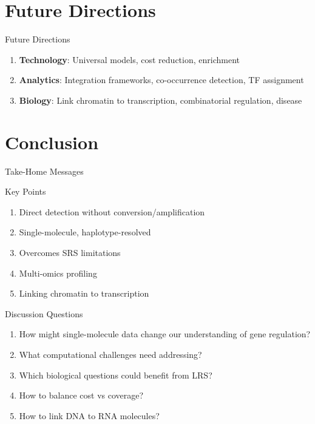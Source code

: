 \documentclass[aspectratio=169]{beamer}
\begin{document}
\section{Future Directions}

\begin{frame}{Future Directions}
  \begin{enumerate}
    \item \textbf{Technology}: Universal models, cost reduction, enrichment

    \item \textbf{Analytics}: Integration frameworks, co-occurrence detection, TF assignment

    \item \textbf{Biology}: Link chromatin to transcription, combinatorial regulation, disease
  \end{enumerate}
\end{frame}

\section{Conclusion}

\begin{frame}{Take-Home Messages}
  \begin{alertblock}{Key Points}
    \begin{enumerate}
      \item Direct detection without conversion/amplification

      \item Single-molecule, haplotype-resolved

      \item Overcomes SRS limitations

      \item Multi-omics profiling

      \item Linking chromatin to transcription
    \end{enumerate}
  \end{alertblock}
\end{frame}

\begin{frame}{Discussion Questions}
  \begin{enumerate}
    \item How might single-molecule data change our understanding of gene regulation?

    \item What computational challenges need addressing?

    \item Which biological questions could benefit from LRS?

    \item How to balance cost vs coverage?

    \item How to link DNA to RNA molecules?
  \end{enumerate}
\end{frame}
\end{document}
